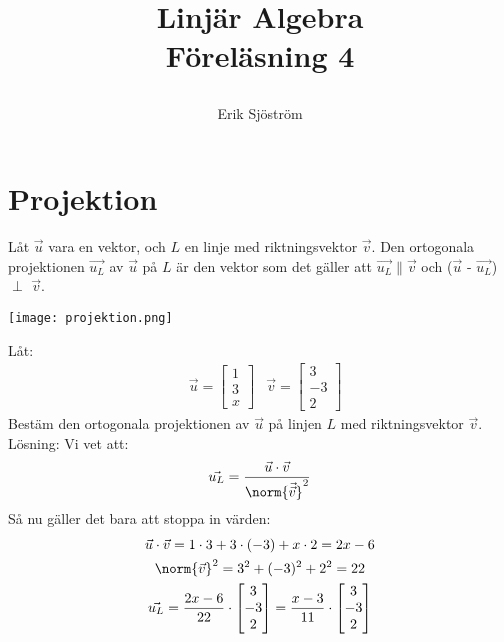 
\title{
	 Linjär Algebra\\
	 Föreläsning 4
    \author{Erik Sjöström}
}

\maketitle

\section{Projektion} %
\label{sec:projektion}
\begin{Def}
    Låt $\vec{u}$ vara en vektor, och $L$ en linje med riktningsvektor $\vec{v}$. Den ortogonala projektionen $\vec{u_L}$ av $\vec{u}$ på $L$ är den vektor som det gäller att $\vec{u_L} \parallel \vec{v}$ och ($\vec{u}$ - $\vec{u_L}$) $\perp$ $\vec{v}$.
\end{Def}
\begin{center}
	\texttt{[image: projektion.png]}
\end{center}
\begin{Ex}
    Låt:
    \begin{align*}
    &\vec{u} = \begin{bmatrix} 1\\3\\x \end{bmatrix} &\vec{v} = \begin{bmatrix} 3\\-3\\2 \end{bmatrix}
    \end{align*}
    Bestäm den ortogonala projektionen av $\vec{u}$ på linjen $L$ med riktningsvektor $\vec{v}$.\\
    Lösning: Vi vet att:
    \[
        \vec{u_L} = \frac{\vec{u} \cdot \vec{v}}{\norm{\vec{\vec{v}}}^2}
    \]
    Så nu gäller det bara att stoppa in värden:
    \begin{gather*}
    	\vec{u} \cdot \vec{v} = 1 \cdot 3 + 3 \cdot (-3) + x \cdot 2 = 2x - 6\\
    	\norm{\vec{v}}^2 = 3^2 + (-3)^2 + 2^2 = 22\\
    	\vec{u_L} = \frac{2x-6}{22} \cdot \begin{bmatrix} 3\\-3\\2 \end{bmatrix} = \frac{x-3}{11} \cdot \begin{bmatrix} 3\\-3\\2 \end{bmatrix}
    \end{gather*}
\end{Ex}
